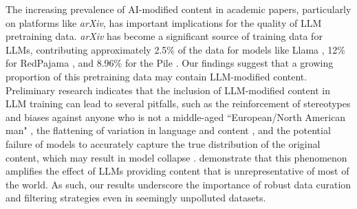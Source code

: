 \documentclass{article}
\begin{document}
The increasing prevalence of AI-modified content in academic papers, particularly on platforms like \textit{arXiv}, has important implications for the quality of LLM pretraining data. \textit{arXiv} has become a significant source of training data for LLMs, contributing approximately 2.5\% of the data for models like Llama \citep{touvron2023llama}, 12\% for RedPajama \citep{elazar2023s}, and 8.96\% for the Pile \citep{gao2020pile}. Our findings suggest that a growing proportion of this pretraining data may contain LLM-modified content. Preliminary research indicates that the inclusion of LLM-modified content \citep{veselovsky2023artificial} in LLM training can lead to several pitfalls, such as the reinforcement of stereotypes and biases against anyone who is not a middle-aged ``European/North American man" \citep{ghosh2023person, santurkar2023whose}, the flattening of variation in language and content \citep{dell2023navigating}, and the potential failure of models to accurately capture the true distribution of the original content, which may result in model collapse \citep{shumailov2023curse}. \cite{santurkar2023whose} demonstrate that this phenomenon amplifies the effect of LLMs providing content that is unrepresentative of most of the world. As such, our results underscore the 
importance of robust data curation and filtering strategies even in seemingly unpolluted datasets.




















 
\end{document}
